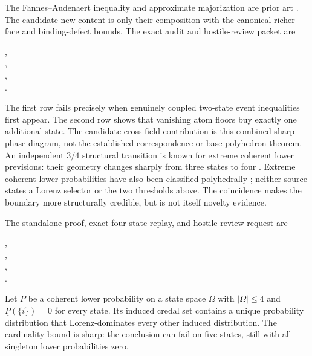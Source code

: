 The Fannes--Audenaert inequality and approximate majorization are prior art
\citep{Audenaert2007,HorodeckiOppenheimSparaciari2018}.  The candidate new
content is only their composition with the canonical richer-face and
binding-defect bounds.  The exact audit and hostile-review packet are
\begin{center}
\small{},\\[-2pt]
\small{},\\[-2pt]
\small{},\\[-2pt]
\small{}.
\end{center}

The first row fails precisely when genuinely coupled two-state event
inequalities first appear.  The second row shows that vanishing atom floors
buy exactly one additional state.  The candidate cross-field contribution is
this combined sharp phase diagram, not the established correspondence or
base-polyhedron theorem.  An independent $3/4$ structural transition is known
for extreme coherent lower previsions: their geometry changes sharply from
three states to four \citep{DeBockDeCooman2015}.  Extreme coherent lower
probabilities have also been classified polyhedrally
\citep{QuaeghebeurDeCooman2008}; neither source states a Lorenz selector or
the two thresholds above.  The coincidence makes the boundary more
structurally credible, but is not itself novelty evidence.

The standalone proof, exact four-state replay, and hostile-review request are
\begin{center}
\small{},\\[-2pt]
\small{},\\[-2pt]
\small{},\\[-2pt]
\small{}.
\end{center}

\begin{corollary}
\label{cor:lx-credal-four-five-threshold}
Let $\underline P$ be a coherent lower probability on a state space $\Omega$
with $|\Omega|\leq4$ and
$\underline P(\{i\})=0$ for every state.  Its induced credal set contains a
unique probability distribution that Lorenz-dominates every other induced
distribution.  The cardinality bound is sharp: the conclusion can fail on
five states, still with all singleton lower probabilities zero.
\end{corollary}

